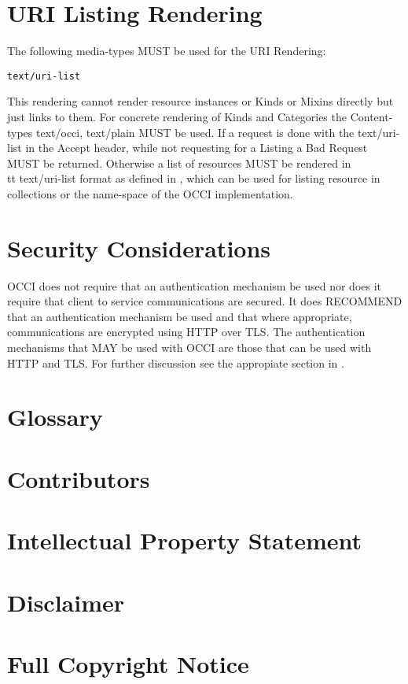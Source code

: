 \documentclass[10pt,a4paper]{article}
\begin{document}
\section{URI Listing Rendering}
\label{sec:urilist}
The following media-types MUST be used for the URI Rendering:

{\tt text/uri-list}

This rendering cannot render resource instances or Kinds or Mixins directly but just links to them. For concrete rendering of Kinds and Categories the Content-types text/occi, text/plain MUST be used. If a request is done with the text/uri-list in the Accept header, while not requesting for a Listing a Bad Request MUST be returned. Otherwise a list of resources MUST be rendered in {\\tt text/uri-list} format as defined in \cite{rfc2483}, which can be used for listing resource in collections or the name-space of the OCCI implementation.

\section{Security Considerations}
OCCI does not require that an authentication mechanism be used nor
does it require that client to service communications are secured. It
does RECOMMEND that an authentication mechanism be used and that where
appropriate, communications are encrypted using HTTP over TLS. The
authentication mechanisms that MAY be used with OCCI are those that
can be used with HTTP and TLS. For further discussion see the
appropiate section in \cite{occi:protocol}.

\section{Glossary}
\label{sec:glossary}


\section{Contributors}


\section{Intellectual Property Statement}


\section{Disclaimer}


\section{Full Copyright Notice}




\end{document}

